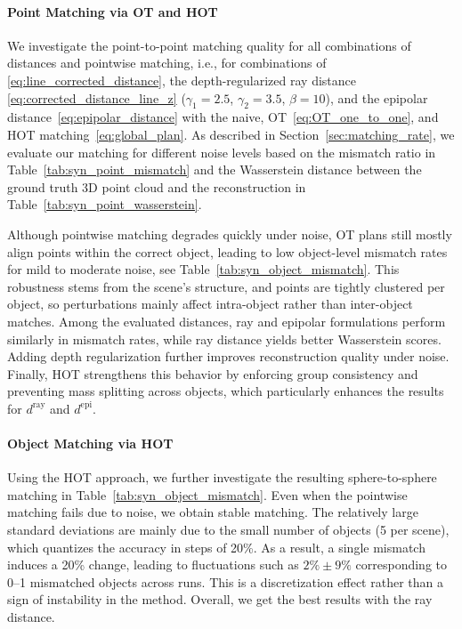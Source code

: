 \documentclass[10pt, twocolumn]{article}
\theoremstyle{definition}
\begin{document}
\paragraph*{Point Matching via OT and HOT}
We investigate the point-to-point matching quality for 
all combinations of distances and pointwise matching, i.e.,
for combinations of \eqref{eq:line_corrected_distance}, the depth-regularized ray distance \eqref{eq:corrected_distance_line_z} ($\gamma_1=2.5$, $\gamma_2=3.5$, $\beta=10$), and the epipolar distance~\eqref{eq:epipolar_distance}
with the naive, OT~\eqref{eq:OT_one_to_one}, and HOT matching~\eqref{eq:global_plan}. As described in Section~\ref{sec:matching_rate}, we evaluate our matching for different noise levels 
based on the mismatch ratio in Table~\ref{tab:syn_point_mismatch} and  the Wasserstein distance between the ground truth 3D point cloud and the reconstruction
in Table~\ref{tab:syn_point_wasserstein}.

{\color{black}
Although pointwise matching degrades quickly under noise, OT plans still mostly align points within the correct object, leading to low object-level mismatch rates for mild to moderate noise, see Table~\ref{tab:syn_object_mismatch}.
This robustness stems from the scene’s structure, and points are tightly clustered per object, so perturbations mainly affect intra-object rather than inter-object matches. Among the evaluated distances, ray and epipolar formulations perform similarly in mismatch rates, while ray distance yields better Wasserstein scores. Adding depth regularization further improves reconstruction quality under noise.
Finally, HOT strengthens this behavior by enforcing group consistency and preventing mass splitting across objects, which particularly enhances the results for $d^\text{ray}$ and $d^\text{epi}$.
}

\paragraph*{Object Matching via HOT}
Using the HOT approach, we further investigate the resulting sphere-to-sphere matching in Table~\ref{tab:syn_object_mismatch}. {Even when the pointwise matching fails due to noise}, we obtain stable matching.
{\color{black}
The relatively large standard deviations are mainly due to the small number of objects (5 per scene), which quantizes the accuracy in steps of 20\%. As a result, a single mismatch induces a 20\% change, leading to fluctuations such as $2\% \pm 9\%$ corresponding to 0–1 mismatched objects across runs. This is a discretization effect rather than a sign of instability in the method.
}
Overall, we get the best results with the ray distance. 
\end{document}
